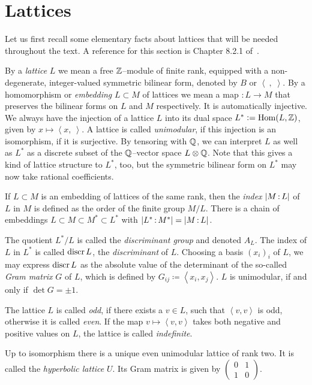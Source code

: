 \section{Lattices}\label{latticeSubsection}
Let us first recall some elementary facts about lattices that will be needed throughout the text.
A reference for this section is Chapter 8.2.1 of~\cite{Dolgachev}. 
\begin{definition}
By a \emph{lattice} $L$ we mean a free $\mathbb{Z}$--module of finite rank, equipped with a non-degenerate, integer-valued symmetric bilinear form, denoted by $B$ or $\left<\ ,\;\right>$. 
By a homomorphism or \emph{embedding} $L\subset M$ of lattices we mean a map $:L\rightarrow M$ that preserves the bilinear forms on $L$ and $M$ respectively. It is automatically injective. We always have the injection of a lattice $L$ into its dual space $L^*\vcentcolon= \operatorname{Hom}(L,\mathbb{Z})$, given by $x \mapsto \left<x,\ \right>$. A lattice is called \emph{unimodular}, if this injection is an isomorphism, \ie if it is surjective. By tensoring with $\mathbb{Q}$, we can interpret $L$ as well as $L^*$ as a discrete subset of the $\mathbb{Q}$--vector space $L\otimes \mathbb{Q}$. Note that this gives a kind of lattice structure to $L^*$, too, but the symmetric bilinear form on $L^*$ may now take rational coefficients.


If $L\subset M$ is an embedding of lattices of the same rank, then the \emph{index} $|M\,{:}\, L|$ of $L$ in $M$ is defined as the order of the finite group $M/L$.
There is a chain of embeddings $L\subset M \subset M^* \subset L^*$ with $|L^*\,{:}\, M^*| =|M\,{:}\, L| $.

The quotient $L^*/L$ is called the \emph{discriminant group} and denoted $A_L$. The index of $L$ in $L^*$ is called $\operatorname{discr} L$, the \emph{discriminant} of $L$.
Choosing a basis $(x_i)_i$ of $L$, we may express $\operatorname{discr} L$ as the absolute value of the determinant of the so-called \emph{Gram matrix} $G$ of $L$, which is defined by $G_{ij}\coloneqq \left<x_i,x_j\right>$. $L$ is unimodular, if and only if $\det G =\pm 1$.

The lattice $L$ is called \emph{odd}, if there exists a $v\in L$, such that $\left<v,v\right>$ is odd, otherwise it is called \emph{even}. 
If the map $v \mapsto \left<v,v\right>$ takes both negative and positive values on $L$, the lattice is called \emph{indefinite}. 
\end{definition}
\begin{example}
Up to isomorphism there is a unique even unimodular lattice of rank two. It is called the \emph{hyperbolic lattice} $U$. Its Gram matrix is given by 
$\left(\begin{smallmatrix} 0&1\\ 1&0 \end{smallmatrix}\right)$.
\end{example}
